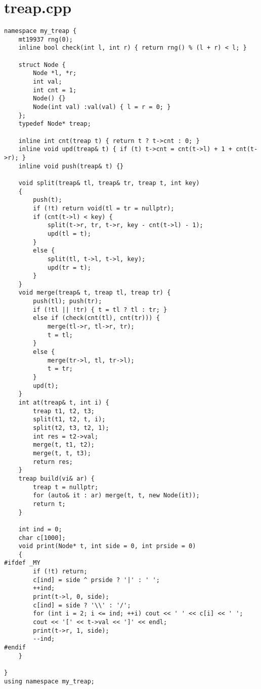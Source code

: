 \documentclass[a4paper,12pt]{report}
\begin{document}
\section{treap.cpp}
\begin{lstlisting}
namespace my_treap {
    mt19937 rng(0);
    inline bool check(int l, int r) { return rng() % (l + r) < l; }

    struct Node {
        Node *l, *r;
        int val;
        int cnt = 1;
        Node() {}
        Node(int val) :val(val) { l = r = 0; }
    };
    typedef Node* treap;

    inline int cnt(treap t) { return t ? t->cnt : 0; }
    inline void upd(treap& t) { if (t) t->cnt = cnt(t->l) + 1 + cnt(t->r); }
    inline void push(treap& t) {}

    void split(treap& tl, treap& tr, treap t, int key)
    {
        push(t);
        if (!t) return void(tl = tr = nullptr);
        if (cnt(t->l) < key) {
            split(t->r, tr, t->r, key - cnt(t->l) - 1);
            upd(tl = t);
        }
        else {
            split(tl, t->l, t->l, key);
            upd(tr = t);
        }
    }
    void merge(treap& t, treap tl, treap tr) {
        push(tl); push(tr);
        if (!tl || !tr) { t = tl ? tl : tr; }
        else if (check(cnt(tl), cnt(tr))) {
            merge(tl->r, tl->r, tr);
            t = tl;
        }
        else {
            merge(tr->l, tl, tr->l);
            t = tr;
        }
        upd(t);
    }
    int at(treap& t, int i) {
        treap t1, t2, t3;
        split(t1, t2, t, i);
        split(t2, t3, t2, 1);
        int res = t2->val;
        merge(t, t1, t2);
        merge(t, t, t3);
        return res;
    }
    treap build(vi& ar) {
        treap t = nullptr;
        for (auto& it : ar) merge(t, t, new Node(it));
        return t;
    }

    int ind = 0;
    char c[1000];
    void print(Node* t, int side = 0, int prside = 0)
	{
#ifdef _MY
		if (!t) return;
		c[ind] = side ^ prside ? '|' : ' ';
		++ind;
		print(t->l, 0, side);
		c[ind] = side ? '\\' : '/';
		for (int i = 2; i <= ind; ++i) cout << ' ' << c[i] << ' ';
		cout << '[' << t->val << ']' << endl;
		print(t->r, 1, side);
		--ind;
#endif
	}

}
using namespace my_treap;

\end{lstlisting}
\end{document}
